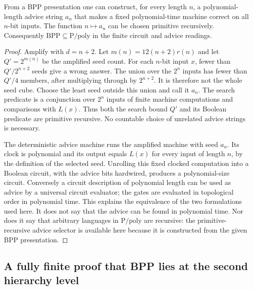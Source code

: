 \begin{theorem}\label{thm:R07}
From a BPP presentation one can construct, for every length $n$, a
polynomial-length advice string $a_n$ that makes a fixed polynomial-time
machine correct on all $n$-bit inputs. The function $n\mapsto a_n$ can be
chosen primitive recursively. Consequently
$\mathrm{BPP}\subseteq\mathrm P/\mathrm{poly}$ in the finite circuit
and advice readings.
\end{theorem}
\begin{proof}
Amplify with $d=n+2$. Let $m(n)=12(n+2)r(n)$ and let $Q'=2^{m(n)}$ be
the amplified seed count. For each $n$-bit input $x$, fewer than
$Q'/2^{n+2}$ seeds give a wrong answer. The union over the $2^n$ inputs
has fewer than $Q'/4$ members, after multiplying through by $2^{n+2}$.
It is therefore not the whole seed cube. Choose the least seed outside
this union and call it $a_n$. The search predicate is a conjunction over
$2^n$ inputs of finite machine computations and comparisons with $L(x)$.
Thus both the search bound $Q'$ and its Boolean predicate are primitive
recursive. No countable choice of unrelated advice strings is necessary.

The deterministic advice machine runs the amplified machine with seed
$a_n$. Its clock is polynomial and its output equals $L(x)$ for every
input of length $n$, by the definition of the selected seed. Unrolling
this fixed clocked computation into a Boolean circuit, with the advice
bits hardwired, produces a polynomial-size circuit. Conversely a circuit
description of polynomial length can be used as advice by a universal
circuit evaluator; the gates are evaluated in topological order in
polynomial time. This explains the equivalence of the two formulations
used here. It does not say that the advice can be found in polynomial
time. Nor does it say that arbitrary languages in $\mathrm P/\mathrm{poly}$
are recursive: the primitive-recursive advice selector is available here
because it is constructed from the given BPP presentation.
\end{proof}

\subsection{A fully finite proof that BPP lies at the second hierarchy level}

